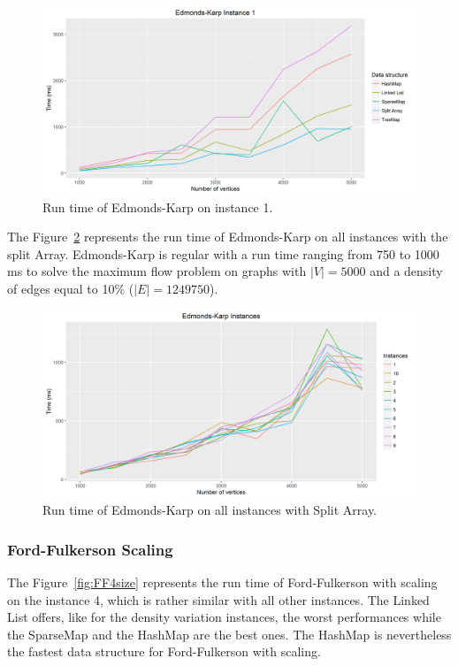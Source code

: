 \begin{figure}[H]
\includegraphics[scale=0.5]{images/EK1size.png}
\caption{Run time of Edmonds-Karp on instance 1.}
\label{fig:EK1size}
\end{figure}

The Figure~\ref{fig:EKmeansize} represents the run time of Edmonds-Karp on all instances with the split Array. Edmonds-Karp is regular with a run time ranging from 750 to 1000 ms to solve the maximum flow problem on graphs with $|V|=5000$ and a density of edges equal to 10\% ($|E|=1249750$).

\begin{figure}[H]
\includegraphics[scale=0.5]{images/EKmeansize.png}
\caption{Run time of Edmonds-Karp on all instances with Split Array.}
\label{fig:EKmeansize}
\end{figure}

\subsubsection{Ford-Fulkerson Scaling}

The Figure~\ref{fig:FF4size} represents the run time of Ford-Fulkerson with scaling on the instance 4, which is rather similar with all other instances. The Linked List offers, like for the density variation instances, the worst performances while the SparseMap and the HashMap are the best ones. The HashMap is nevertheless the fastest data structure for Ford-Fulkerson with scaling.

